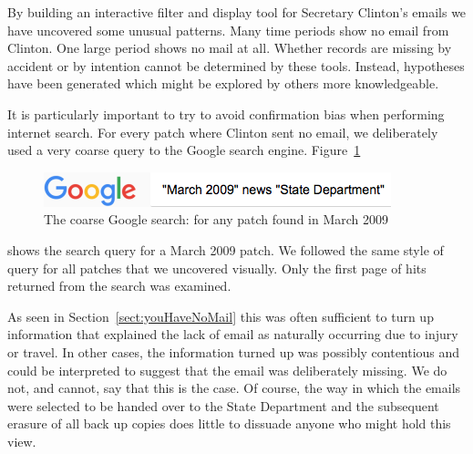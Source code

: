 \documentclass[journal]{vgtc}                %
\begin{document}
By building an interactive filter and display tool for Secretary Clinton's emails we have uncovered some unusual patterns.  Many time periods show no email from Clinton.  One large period shows no mail at all.  Whether records are missing by accident or by intention cannot be determined by these tools. 
Instead, hypotheses have been generated which might be explored by others more knowledgeable.

It is particularly important to try to avoid confirmation bias when performing internet search.  For every patch where Clinton sent no email, we deliberately used a very coarse query to the Google search engine.   
Figure~\ref{fig:googleSearch}
\begin{figure}[h]
\begin{center}
\includegraphics[width=0.75\linewidth]{googleSearch}
\caption{The coarse Google search: for any patch found in March 2009}
\label{fig:googleSearch}
\end{center}
\end{figure}
shows the search query for a March 2009 patch.  We followed the same style of query for all patches that we uncovered visually.  Only the first page of hits returned from the search was examined.

As seen in Section~\ref{sect:youHaveNoMail} this was often sufficient to turn up information that explained the lack of email as naturally occurring due to injury or travel.  In other cases, the information turned up was possibly contentious and could be interpreted to suggest that the email was deliberately missing.  We do not, and cannot, say that this is the case.  Of course, the way in which the emails were selected to be handed over to the State Department and the subsequent erasure of all back up copies does little to dissuade anyone who might hold this view.
\end{document}
